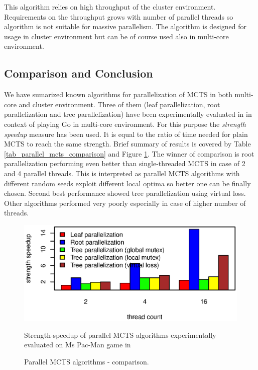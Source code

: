 This algorithm relies on high throughput of the cluster environment. Requirements on the throughput
grows with number of parallel threads so algorithm is not suitable for massive parallelism. The
algorithm is designed for usage in cluster environment but can be of course used also in multi-core
environment.


\subsection{Comparison and Conclusion}
\label{sec_parallel_mcts_comparison}

We have sumarized known algorithms for parallelization of MCTS in both multi-core and cluster
environment. Three of them (leaf parallelization, root parallelization and tree
parallelization)
have been experimentally evaluated in \cite{Chaslot2008} in context of playing Go in multi-core
environment. For this purpose the \emph{strength speedup} measure has been used. It is equal to
 the ratio of time needed for plain
MCTS to reach the same strength. Brief summary of results is covered by Table
\ref{tab_parallel_mcts_comparison} and Figure \ref{fig_parallel_mcts_comparison}. The winner of comparison is root parallelization performing even
better than single-threaded MCTS in case of 2 and 4 parallel threads. This is interpreted as 
parallel MCTS algorithms with different random seeds exploit different local optima so better one
can be finally chosen. Second best performance showed tree parallelization using virtual loss. Other
algorithms performed very poorly especially in case of higher number of threads.

\begin{figure}
\begin{center}
\includegraphics{img/parallel-mcts.eps}
\end{center}
\caption{\footnotesize Parallel MCTS algorithms - comparison.}{\footnotesize Strength-speedup
of parallel MCTS algorithms experimentally evaluated on Ms Pac-Man game in \cite{Chaslot2008}}
\label{fig_parallel_mcts_comparison}
\end{figure}


